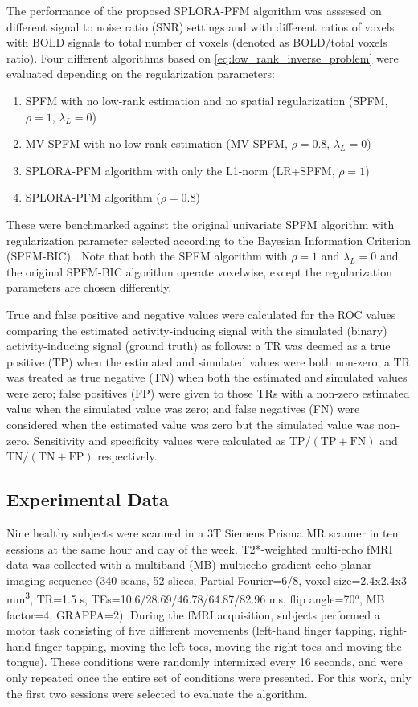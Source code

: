 The performance of the proposed SPLORA-PFM algorithm was asssesed on
different signal to noise ratio (SNR) settings and with different ratios of
voxels with BOLD signals to total number of voxels (denoted as BOLD/total voxels
ratio). Four different algorithms based on \cref{eq:low_rank_inverse_problem}
were evaluated depending on the regularization parameters: 
\begin{enumerate}
    \item SPFM with no low-rank estimation and no spatial regularization (SPFM,
    $\rho=1$, $\lambda_L=0$)
    \item MV-SPFM with no low-rank estimation (MV-SPFM, $\rho = 0.8$,
    $\lambda_L=0$)
    \item SPLORA-PFM algorithm with only the L1-norm (LR+SPFM, $\rho=1$)
    \item SPLORA-PFM algorithm ($\rho = 0.8$)
\end{enumerate}
These were benchmarked against the original univariate SPFM
algorithm with regularization parameter selected according to the Bayesian
Information Criterion (SPFM-BIC) \citep{Gaudes2013Paradigmfreemapping}. Note
that both the SPFM algorithm with $\rho=1$ and $\lambda_L=0$ and the original
SPFM-BIC algorithm operate voxelwise, except the regularization parameters are
chosen differently.

True and false positive and negative values were calculated for the ROC values
comparing the estimated activity-inducing signal with the simulated (binary)
activity-inducing signal (ground truth) as follows: a TR was deemed as a true
positive (TP) when the estimated and simulated values were both non-zero; a TR
was treated as true negative (TN) when both the estimated and simulated values
were zero; false positives (FP) were given to those TRs with a non-zero
estimated value when the simulated value was zero; and false negatives (FN) were
considered when the estimated value was zero but the simulated value was
non-zero. Sensitivity and specificity values were calculated as
$\text{TP}/(\text{TP}+\text{FN})$ and $\text{TN}/(\text{TN}+\text{FP})$
respectively.

\subsection{Experimental Data}

Nine healthy subjects were scanned in a 3T Siemens Prisma MR scanner in ten
sessions at the same hour and day of the week. T2*-weighted multi-echo fMRI data
was collected with a multiband (MB) multiecho gradient echo planar imaging
sequence (340 scans, 52 slices, Partial-Fourier=6/8, voxel size=2.4x2.4x3
mm\textsuperscript{3}, TR=1.5 s, TEs=10.6/28.69/46.78/64.87/82.96 ms, flip
angle=70$^o$, MB factor=4, GRAPPA=2). During the fMRI acquisition, subjects
performed a motor task consisting of five different movements (left-hand finger
tapping, right-hand finger tapping, moving the left toes, moving the right toes
and moving the tongue). These conditions were randomly intermixed every 16
seconds, and were only repeated once the entire set of conditions were
presented. For this work, only the first two sessions were selected to evaluate
the algorithm. 

